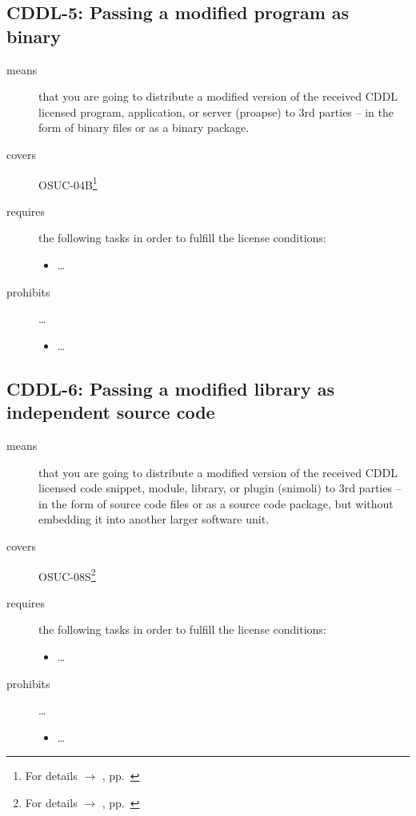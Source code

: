 \subsection{CDDL-5: Passing a modified program as binary}
\label{OSUC-04B-CDDL} 

\begin{description}
\item[means] that you are going to distribute a modified version of the received
CDDL licensed pro\-gram, application, or server (proapse) to 3rd parties -- in
the form of binary files or as a binary package.
\item[covers] OSUC-04B\footnote{For details $\rightarrow$ \oslic, pp.\
\pageref{OSUC-04B-DEF}}
\item[requires] the following tasks in order to fulfill the license conditions:
\begin{itemize}
  
  \item \ldots
  
\end{itemize}

\item[prohibits] \ldots
\begin{itemize}
  \item \ldots
\end{itemize}
\end{description}

\subsection{CDDL-6: Passing a modified library as independent source code}
\label{OSUC-08S-CDDL}

\begin{description}
\item[means] that you are going to distribute a modified version of the received
CDDL licensed code snippet, module, library, or plugin (snimoli) to 3rd parties
-- in the form of source code files or as a source code package, but without
embedding it into another larger software unit.
\item[covers] OSUC-08S\footnote{For details $\rightarrow$ \oslic, pp.\
\pageref{OSUC-08S-DEF}}
\item[requires] the following tasks in order to fulfill the license conditions:
\begin{itemize}
  
  \item \ldots
  
\end{itemize}

\item[prohibits] \ldots
\begin{itemize}
  \item \ldots
\end{itemize}
\end{description}

